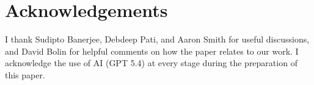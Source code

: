 \documentclass[11pt, reqno]{amsart}
\newtheorem{lemma}{Lemma}
\theoremstyle{remark}
\newcommand{\1}{\mathbf{1}}
\begin{document}
\section*{Acknowledgements}
I thank Sudipto Banerjee, Debdeep Pati, and Aaron Smith for useful discussions, and David Bolin for helpful comments on how the paper \cite{BoliKirc2023} relates to our work. I acknowledge the use of AI (GPT 5.4) at every stage during the preparation of this paper.



%
%
\end{document}
